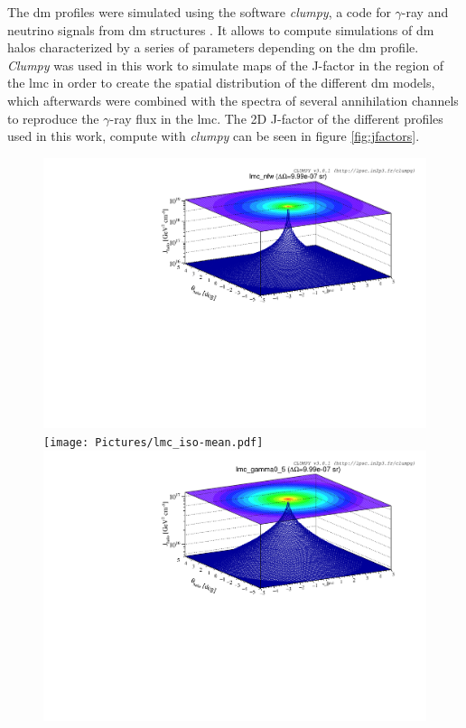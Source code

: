 \documentclass[main.tex]{subfiles}
\begin{document}
The \gls{dm} profiles were simulated using the software \textit{clumpy}, a code for $\gamma$-ray and neutrino signals from \gls{dm} structures \cite{2019CLUMPY}. It allows to compute simulations of \gls{dm} halos characterized by a series of parameters depending on the \gls{dm} profile. \textit{Clumpy} was used in this work to simulate maps of the J-factor in the region of the \gls{lmc} in order to create the spatial distribution of the different \gls{dm} models, which afterwards were combined with the spectra of several annihilation channels to reproduce the $\gamma$-ray flux in the \gls{lmc}. 
The 2D J-factor of the different profiles used in this work, compute with \textit{clumpy} can be seen in figure \ref{fig:jfactors}.

\begin{figure}
\centering
{}
\includegraphics[width=1\textwidth]{Pictures/lmc_nfw.pdf}
\endminipage 
{}
\texttt{[image: Pictures/lmc\_iso-mean.pdf]}
\endminipage \\
\includegraphics[width=1\textwidth]{Pictures/lmc_gamma0-5.pdf}

\end{figure}
\end{document}
